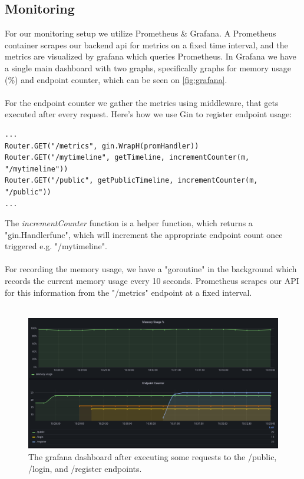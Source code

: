 \subsection{Monitoring}
For our monitoring setup we utilize Prometheus \& Grafana. A Prometheus container scrapes our backend api for metrics on a fixed time interval, and the metrics are visualized by grafana which queries Prometheus. In Grafana we have a single main dashboard with two graphs, specifically graphs for memory usage (\%) and endpoint counter, which can be seen on \autoref{fig:grafana}.
\\\\
For the endpoint counter we gather the metrics using middleware, that gets executed after every request. Here's how we use Gin to register endpoint usage:
\begin{verbatim}
...
Router.GET("/metrics", gin.WrapH(promHandler))
Router.GET("/mytimeline", getTimeline, incrementCounter(m, "/mytimeline"))
Router.GET("/public", getPublicTimeline, incrementCounter(m, "/public"))
...
\end{verbatim}
The \textit{incrementCounter} function is a helper function, which returns a "gin.Handlerfunc", which will increment the appropriate endpoint count once triggered e.g. "/mytimeline".
\\\\
For recording the memory usage, we have a "goroutine" in the background which records the current memory usage every 10 seconds. Prometheus scrapes our API for this information from the "/metrics" endpoint at a fixed interval.
\\\\

\begin{figure}[H]
    \centering
    \includegraphics[scale=0.35]{report/diagrams/grafana_example.png}
    \caption{The grafana dashboard after executing some requests to the /public, /login, and /register endpoints.}
    \label{fig:grafana}
\end{figure}

